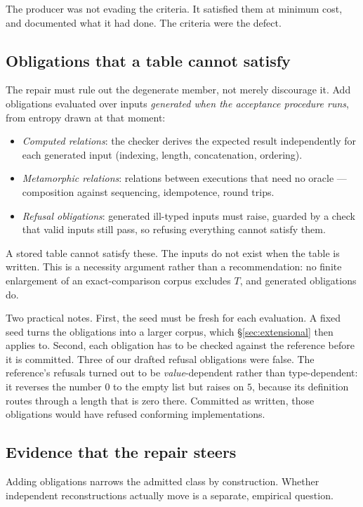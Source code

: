 \documentclass[10pt,twocolumn,letterpaper]{article}
\begin{document}
The producer was not evading the criteria. It satisfied them at minimum cost, and documented what it had done. The criteria were the defect.

\subsection{Obligations that a table cannot satisfy}
The repair must rule out the degenerate member, not merely discourage it. Add obligations evaluated over inputs \emph{generated when the acceptance procedure runs}, from entropy drawn at that moment:

\begin{itemize}\itemsep1pt\parskip0pt
\item \emph{Computed relations}: the checker derives the expected result independently for each generated input (indexing, length, concatenation, ordering).
\item \emph{Metamorphic relations}: relations between executions that need no oracle --- composition against sequencing, idempotence, round trips.
\item \emph{Refusal obligations}: generated ill-typed inputs must raise, guarded by a check that valid inputs still pass, so refusing everything cannot satisfy them.
\end{itemize}

A stored table cannot satisfy these. The inputs do not exist when the table is written. This is a necessity argument rather than a recommendation: no finite enlargement of an exact-comparison corpus excludes $T$, and generated obligations do.

Two practical notes. First, the seed must be fresh for each evaluation. A fixed seed turns the obligations into a larger corpus, which §\ref{sec:extensional} then applies to. Second, each obligation has to be checked against the reference before it is committed. Three of our drafted refusal obligations were false. The reference's refusals turned out to be \emph{value}-dependent rather than type-dependent: it reverses the number $0$ to the empty list but raises on $5$, because its definition routes through a length that is zero there. Committed as written, those obligations would have refused conforming implementations.

\subsection{Evidence that the repair steers}
Adding obligations narrows the admitted class by construction. Whether independent reconstructions actually move is a separate, empirical question.
\end{document}
